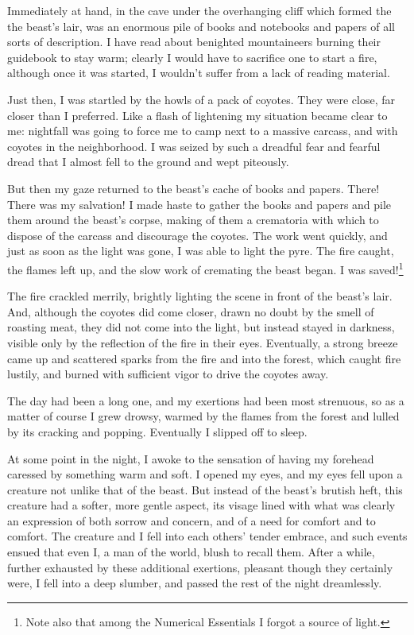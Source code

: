 \par
Immediately at hand, in the cave under the overhanging cliff which formed the the beast's lair, was an enormous pile of books and notebooks and papers of all sorts of description.  I have read about benighted mountaineers burning their guidebook to stay warm; clearly I would have to sacrifice one to start a fire, although once it was started, I wouldn't suffer from a lack of reading material.
\par
Just then, I was startled by the howls of a pack of coyotes.  They were close, far closer than I preferred.  Like a flash of lightening my situation became clear to me: nightfall was going to force me to camp next to a massive carcass, and with coyotes in the neighborhood.  I was seized by such a dreadful fear and fearful dread that I almost fell to the ground and wept piteously.
\par
But then my gaze returned to the beast's cache of books and papers.  There!  There was my salvation!   I made haste to gather the books and papers and pile them around the beast's corpse, making of them a crematoria with which to dispose of the carcass and discourage the coyotes.  The work went quickly, and just as soon as the light was gone, I was able to light the pyre.  The fire caught, the flames left up, and the slow work of cremating the beast began.  I was saved!\footnote{Note also that among the Numerical Essentials I forgot a source of light.}
\par
The fire crackled merrily, brightly lighting the scene in front of the beast's lair.  And, although the coyotes did come closer, drawn no doubt by the smell of roasting meat, they did not come into the light, but instead stayed in darkness, visible only by the reflection of the fire in their eyes.  Eventually, a strong breeze came up and scattered sparks from the fire and into the forest, which caught fire lustily, and burned with sufficient vigor to drive the coyotes away.
\par
The day had been a long one, and my exertions had been most strenuous, so as a matter of course I grew drowsy, warmed by the flames from the forest and lulled by its cracking and popping.  Eventually I slipped off to sleep.
\par
At some point in the night, I awoke to the sensation of having my forehead caressed by something warm and soft.  I opened my eyes, and my eyes fell upon a creature not unlike that of the beast.  But instead of the beast's brutish heft, this creature had a softer, more gentle aspect, its visage lined with what was clearly an expression of both sorrow and concern, and of a need for comfort and to comfort.  The creature and I fell into each others' tender embrace, and such events ensued that even I, a man of the world, blush to recall them.  After a while, further exhausted by these additional exertions, pleasant though they certainly were, I fell into a deep slumber, and passed the rest of the night dreamlessly.
